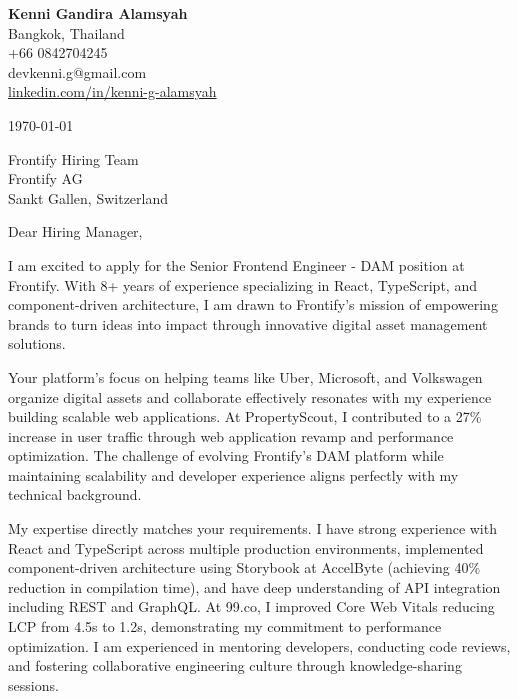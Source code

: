 \documentclass[a4paper, 11pt]{article}
\begin{document}
\begin{flushleft}
    \textbf{\Large Kenni Gandira Alamsyah} \\
    Bangkok, Thailand \\
    +66 0842704245 \\
    devkenni.g@gmail.com \\
    \href{https://www.linkedin.com/in/kenni-g-alamsyah/}{linkedin.com/in/kenni-g-alamsyah}
\end{flushleft}

\vspace{10pt}

\begin{flushleft}
    \today
\end{flushleft}

\vspace{10pt}

\begin{flushleft}
    Frontify Hiring Team \\
    Frontify AG \\
    Sankt Gallen, Switzerland
\end{flushleft}

\vspace{10pt}

Dear Hiring Manager,

I am excited to apply for the Senior Frontend Engineer - DAM position at Frontify. With 8+ years of experience specializing in React, TypeScript, and component-driven architecture, I am drawn to Frontify's mission of empowering brands to turn ideas into impact through innovative digital asset management solutions.

Your platform's focus on helping teams like Uber, Microsoft, and Volkswagen organize digital assets and collaborate effectively resonates with my experience building scalable web applications. At PropertyScout, I contributed to a 27\% increase in user traffic through web application revamp and performance optimization. The challenge of evolving Frontify's DAM platform while maintaining scalability and developer experience aligns perfectly with my technical background.

My expertise directly matches your requirements. I have strong experience with React and TypeScript across multiple production environments, implemented component-driven architecture using Storybook at AccelByte (achieving 40\% reduction in compilation time), and have deep understanding of API integration including REST and GraphQL. At 99.co, I improved Core Web Vitals reducing LCP from 4.5s to 1.2s, demonstrating my commitment to performance optimization. I am experienced in mentoring developers, conducting code reviews, and fostering collaborative engineering culture through knowledge-sharing sessions.
\end{document}
